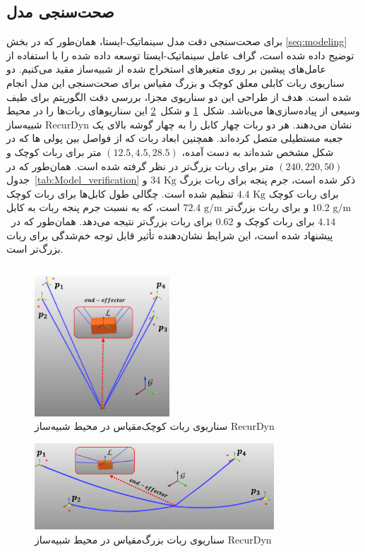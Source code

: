 \subsection{صحت‌سنجی مدل}
برای صحت‌سنجی دقت مدل سینماتیک-ایستا، همان‌طور که در بخش 
\ref{seq:modeling}
توضیح داده شده است، گراف عامل سینماتیک-ایستا توسعه داده شده را با استفاده از عامل‌های پیشین بر روی متغیرهای استخراج شده از شبیه‌ساز مقید می‌کنیم. دو سناریوی ربات کابلی معلق کوچک و بزرگ مقیاس برای صحت‌سنجی این مدل انجام شده است. هدف از طراحی این دو سناریوی مجزا، بررسی دقت الگوریتم برای طیف وسیعی از پیاده‌سازی‌ها می‌باشد. شکل~\ref{fig:recurdyn_small} و شکل~\ref{fig:recurdyn_large} این سناریوهای ربات‌ها را در محیط شبیه‌ساز RecurDyn نشان می‌دهند. هر دو ربات چهار کابل را به چهار گوشه بالای یک جعبه مستطیلی  متصل کرده‌اند. همچنین ابعاد ربات که از فواصل بین پولی ها که در شکل مشخص شده‌اند به دست آمده، $(12.5, 4.5, 28.5)$ متر برای ربات کوچک و $(240, 220, 50)$ متر برای ربات بزرگ‌تر در نظر گرفته شده است. همان‌طور که در جدول~\ref{tab:Model_verification} ذکر شده است، جرم پنجه برای ربات بزرگ $34 \text{ Kg}$ و برای ربات کوچک $4.4 \text{ Kg}$ تنظیم شده است. چگالی طول کابل‌ها برای ربات کوچک $10.2 \text{ g/m}$ و برای ربات بزرگ‌تر $72.4 \text{ g/m}$ است، که به نسبت جرم پنجه ربات به کابل $4.14$ برای ربات کوچک و $0.62$ برای ربات بزرگ‌تر نتیجه می‌دهد. همان‌طور که در~\cite{pott2013cable} پیشنهاد شده است، این شرایط نشان‌دهنده تأثیر قابل توجه خم‌شدگی برای ربات بزرگ‌تر است.

\begin{figure} [t]
	\centering
	\includegraphics[width=0.45\textwidth]{img/E2_small.pdf}
	\caption{سناریوی ربات کوچک‌مقیاس در محیط شبیه‌ساز RecurDyn}
	\label{fig:recurdyn_small}
\end{figure}

\begin{figure} [b]
	\centering
	\includegraphics[width=0.8\textwidth]{img/E1_large.pdf}
	\caption{سناریوی ربات بزرگ‌مقیاس در محیط شبیه‌ساز RecurDyn}
	\label{fig:recurdyn_large}
\end{figure}

